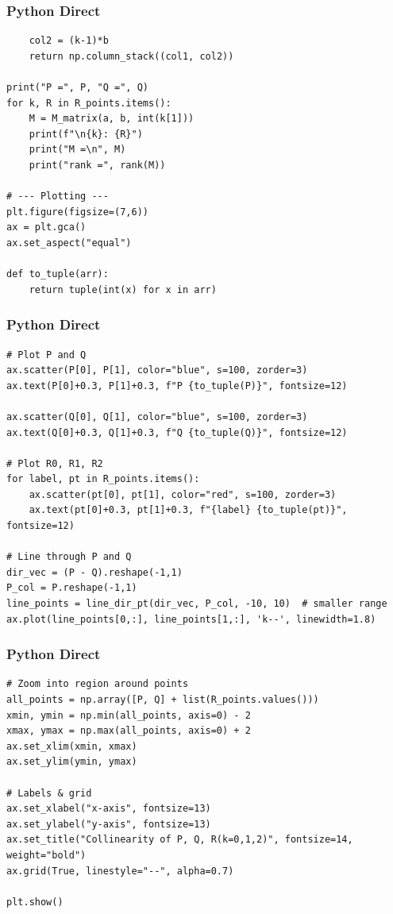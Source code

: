 \documentclass{beamer}
\begin{document}
\begin{frame}[fragile]
    \frametitle{Python Direct}
    \begin{lstlisting}
    col2 = (k-1)*b
    return np.column_stack((col1, col2))

print("P =", P, "Q =", Q)
for k, R in R_points.items():
    M = M_matrix(a, b, int(k[1]))
    print(f"\n{k}: {R}")
    print("M =\n", M)
    print("rank =", rank(M))

# --- Plotting ---
plt.figure(figsize=(7,6))
ax = plt.gca()
ax.set_aspect("equal")

def to_tuple(arr):
    return tuple(int(x) for x in arr)
 \end{lstlisting}
\end{frame}

\begin{frame}[fragile]
    \frametitle{Python Direct}
    \begin{lstlisting}
# Plot P and Q
ax.scatter(P[0], P[1], color="blue", s=100, zorder=3)
ax.text(P[0]+0.3, P[1]+0.3, f"P {to_tuple(P)}", fontsize=12)

ax.scatter(Q[0], Q[1], color="blue", s=100, zorder=3)
ax.text(Q[0]+0.3, Q[1]+0.3, f"Q {to_tuple(Q)}", fontsize=12)

# Plot R0, R1, R2
for label, pt in R_points.items():
    ax.scatter(pt[0], pt[1], color="red", s=100, zorder=3)
    ax.text(pt[0]+0.3, pt[1]+0.3, f"{label} {to_tuple(pt)}", fontsize=12)

# Line through P and Q
dir_vec = (P - Q).reshape(-1,1)
P_col = P.reshape(-1,1)
line_points = line_dir_pt(dir_vec, P_col, -10, 10)  # smaller range
ax.plot(line_points[0,:], line_points[1,:], 'k--', linewidth=1.8)
 \end{lstlisting}
\end{frame}

\begin{frame}[fragile]
    \frametitle{Python Direct}
    \begin{lstlisting}
# Zoom into region around points
all_points = np.array([P, Q] + list(R_points.values()))
xmin, ymin = np.min(all_points, axis=0) - 2
xmax, ymax = np.max(all_points, axis=0) + 2
ax.set_xlim(xmin, xmax)
ax.set_ylim(ymin, ymax)

# Labels & grid
ax.set_xlabel("x-axis", fontsize=13)
ax.set_ylabel("y-axis", fontsize=13)
ax.set_title("Collinearity of P, Q, R(k=0,1,2)", fontsize=14, weight="bold")
ax.grid(True, linestyle="--", alpha=0.7)

plt.show()
    \end{lstlisting}
    \end{frame}
 
\end{document}
